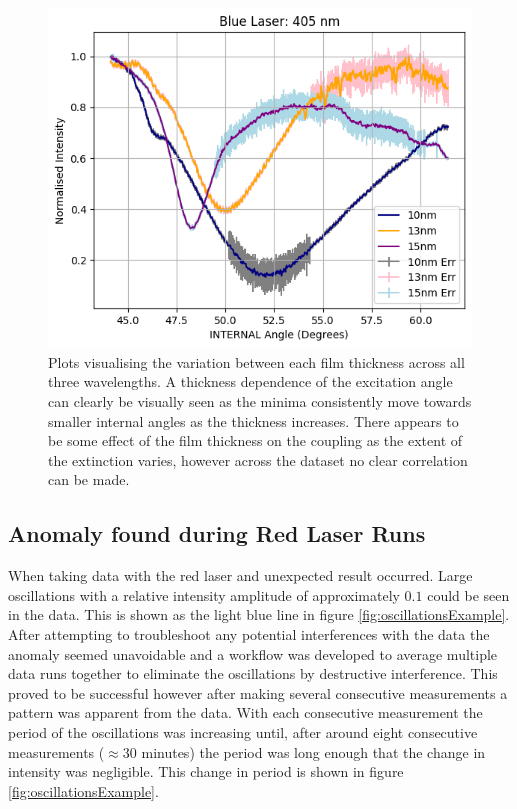 \documentclass[%
reprint,
amsmath,amssymb,
aps,
]{revtex4-2}
\begin{document}
\begin{figure}
				\includegraphics[width=0.85\columnwidth]{blueThicknessVariation.png}
				\caption{\label{fig:thicknessVariation}Plots visualising the variation between each film thickness across all three wavelengths. A thickness dependence of the excitation angle can clearly be visually seen as the minima consistently move towards smaller internal angles as the thickness increases. There appears to be some effect of the film thickness on the coupling as the extent of the extinction varies, however across the dataset no clear correlation can be made.}
			\end{figure}
	
		\subsection{Anomaly found during Red Laser Runs}
			When taking data with the red laser and unexpected result occurred. Large oscillations with a relative intensity amplitude of approximately $0.1$ could be seen in the data. This is shown as the light blue line in figure \ref{fig:oscillationsExample}. After attempting to troubleshoot any potential interferences with the data the anomaly seemed unavoidable and a workflow was developed to average multiple data runs together to eliminate the oscillations by destructive interference. This proved to be successful however after making several consecutive measurements a pattern was apparent from the data. With each consecutive measurement the period of the oscillations was increasing until, after around eight consecutive measurements ($\approx$30 minutes) the period was long enough that the change in intensity was negligible. This change in period is shown in figure \ref{fig:oscillationsExample}.\\
			
\end{document}
